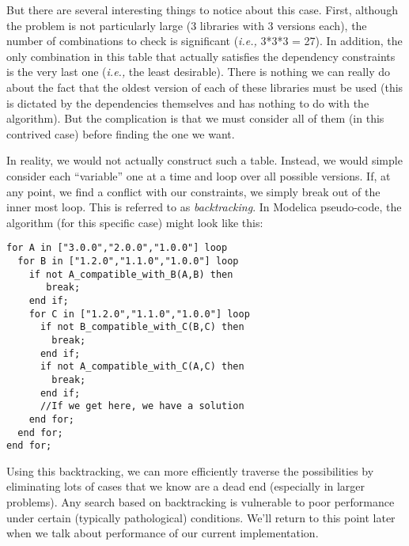 \documentclass[11pt,a4paper,twocolumn]{article}
\renewcommand{\small}{\fontsize{9.5pt}{11.1pt}\selectfont}
\begin{document}
But there are several interesting things to notice about this case.
First, although the problem is not particularly large (3 libraries
with 3 versions each), the number of combinations to check is
significant (\emph{i.e.,} 3*3*3 = 27).  In addition, the only
combination in this table that actually satisfies the dependency
constraints is the very last one (\emph{i.e.,} the least desirable).
There is nothing we can really do about the fact that the oldest
version of each of these libraries must be used (this is dictated by
the dependencies themselves and has nothing to do with the algorithm).
But the complication is that we must consider all of them (in this
contrived case) before finding the one we want.

In reality, we would not actually construct such a table.  Instead, we
would simple consider each ``variable'' one at a time and loop over
all possible versions.  If, at any point, we find a conflict with our
constraints, we simply break out of the inner most loop.  This is
referred to as \emph{backtracking}.  In Modelica pseudo-code, the
algorithm (for this specific case) might look like this:

{\small
\begin{verbatim}
for A in ["3.0.0","2.0.0","1.0.0"] loop
  for B in ["1.2.0","1.1.0","1.0.0"] loop
    if not A_compatible_with_B(A,B) then
       break;
    end if;
    for C in ["1.2.0","1.1.0","1.0.0"] loop
      if not B_compatible_with_C(B,C) then
        break;
      end if;
      if not A_compatible_with_C(A,C) then
        break;
      end if;
      //If we get here, we have a solution
    end for;
  end for;
end for;
\end{verbatim}
}

Using this backtracking, we can more efficiently traverse the
possibilities by eliminating lots of cases that we know are a dead
end (especially in larger problems).  Any search based on backtracking
is vulnerable to poor performance under certain (typically
pathological) conditions.  We'll return to this point later when we
talk about performance of our current implementation.
\end{document}

